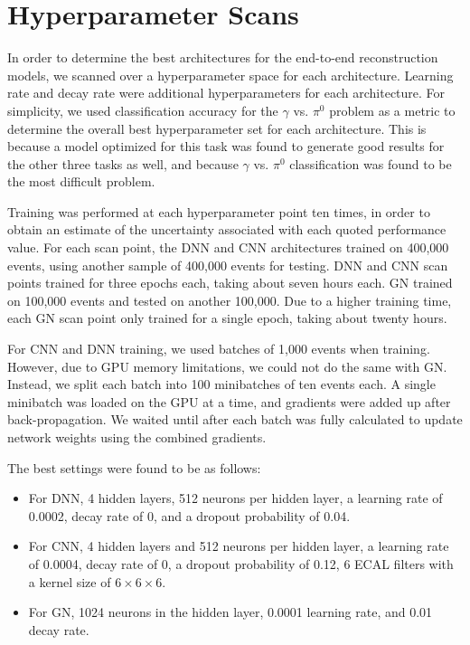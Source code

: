 \section{Hyperparameter Scans}
\label{sec:hpscan}

In order to determine the best architectures for the end-to-end reconstruction models, we scanned over a hyperparameter space for each architecture. Learning rate and decay rate were additional hyperparameters for each architecture. For simplicity, we used classification accuracy for the $\gamma$ vs. $\pi^0$ problem as a metric to determine the overall best hyperparameter set for each architecture. This is because a model optimized for this task was found to generate good results for the other three tasks as well, and because $\gamma$ vs. $\pi^0$ classification was found to be the most difficult problem.

Training was performed at each hyperparameter point ten times, in order to obtain an estimate of the uncertainty associated with each quoted performance value. For each scan point, the DNN and CNN architectures trained on 400,000 events, using another sample of 400,000 events for testing. DNN and CNN scan points trained for three epochs each, taking about seven hours each. GN trained on 100,000 events and tested on another 100,000. Due to a higher training time, each GN scan point only trained for a single epoch, taking about twenty hours.

For CNN and DNN training, we used batches of 1,000 events when training. However, due to GPU memory limitations, we could not do the same with GN. Instead, we split each batch into 100 minibatches of ten events each. A single minibatch was loaded on the GPU at a time, and gradients were added up after back-propagation. We waited until after each batch was fully calculated to update network weights using the combined gradients.

The best settings were found to be as follows:
\begin{itemize}
    \item For DNN, 4 hidden layers, 512 neurons per hidden layer, a learning rate of 0.0002, decay rate of 0, and a dropout probability of 0.04.
    \item For CNN, 4 hidden layers and 512 neurons per hidden layer, a learning rate of 0.0004, decay rate of 0, a dropout probability of 0.12, 6 ECAL filters with a kernel size of $6 \times 6 \times 6$.
    \item For GN, 1024 neurons in the hidden layer, 0.0001 learning rate, and 0.01 decay rate. 
\end{itemize}

